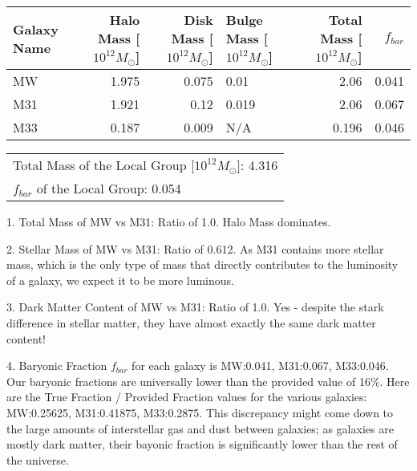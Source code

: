 \documentclass{article}
\begin{document}
 
\begin{tabular}{lrrlrr}
\hline
 Galaxy Name   &   Halo Mass [$10^{12} M_\odot$] &   Disk Mass [$10^{12} M_\odot$] & Bulge Mass [$10^{12} M_\odot$]   &   Total Mass [$10^{12} M_\odot$] &   $f_{bar}$ \\
\hline
 MW            &                           1.975 &                           0.075 & 0.01                             &                            2.06  &       0.041 \\
 M31           &                           1.921 &                           0.12  & 0.019                            &                            2.06  &       0.067 \\
 M33           &                           0.187 &                           0.009 & N/A                              &                            0.196 &       0.046 \\
\hline
\end{tabular}

\begin{tabular}{l}
\hline
 Total Mass of the Local Group [$10^{12} M_\odot$]: 4.316 \\
 $f_{bar}$ of the Local Group: 0.054                      \\
\hline
\end{tabular}

 1. Total Mass of MW vs M31: Ratio of 1.0. Halo Mass dominates.

 2. Stellar Mass of MW vs M31: Ratio of 0.612. As M31 contains more stellar mass, which is the only type of mass that directly contributes to the luminosity of a galaxy, we expect it to be more luminous.

 3. Dark Matter Content of MW vs M31: Ratio of 1.0. Yes - despite the stark difference in stellar matter, they have almost exactly the same dark matter content!

 4. Baryonic Fraction $f_{bar}$ for each galaxy is MW:0.041, M31:0.067, M33:0.046. Our baryonic fractions are universally lower than the provided value of 16\%. Here are the True Fraction / Provided Fraction values for the various galaxies: MW:0.25625, M31:0.41875, M33:0.2875. This discrepancy might come down to the large amounts of interstellar gas and dust between galaxies; as galaxies are mostly dark matter, their bayonic fraction is significantly lower than the rest of the universe.
 
\end{document}
